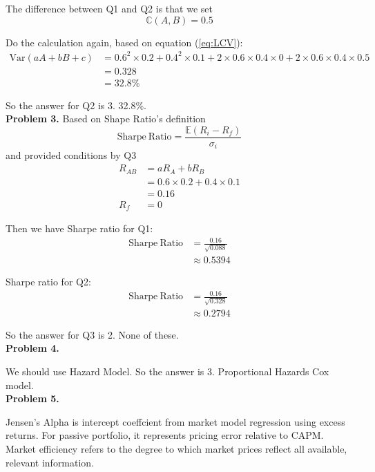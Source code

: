 \documentclass[12pt,a4paper]{article}
\begin{document}
The difference between Q1 and Q2 is that we set
\[
    \mathbb{C}(A,B) = 0.5
\]

Do the calculation again, based on equation (\ref{eq:LCV}):
\[
\begin{aligned}
    \mathrm{Var}(aA+bB+c) &= 0.6^2 \times 0.2 + 0.4^2 \times 0.1 + 2 \times 0.6 \times 0.4 \times 0 + 2 \times 0.6 \times 0.4 \times 0.5\\
    &= 0.328\\
    &= 32.8 \%
\end{aligned}
\]

So the answer for Q2 is 3. 32.8\%.
\\

\textbf{Problem 3.}
Based on Shape Ratio's definition
\[
    \mathrm{Sharpe\ Ratio} = \frac{\mathbb{E}(R_i - R_f)}{\sigma_i}
\]
and provided conditions by Q3
\[
    \begin{aligned}
        R_{AB} &= aR_A + bR_B\\
        &= 0.6\times 0.2 + 0.4 \times 0.1\\
        & = 0.16\\
        R_f &= 0
    \end{aligned}  
\]

Then we have Sharpe ratio for Q1:
\[
    \begin{aligned}
        \mathrm{Sharpe\ Ratio} &= \frac{0.16}{\sqrt{0.088}}\\
        & \approx 0.5394
    \end{aligned}  
\]

Sharpe ratio for Q2:
\[
    \begin{aligned}
        \mathrm{Sharpe\ Ratio} &= \frac{0.16}{\sqrt{0.328}}\\
        & \approx 0.2794
    \end{aligned}  
\]

So the answer for Q3 is 2. None of these.
\\

\textbf{Problem 4.}

We should use Hazard Model. So the answer is 3. Proportional Hazards Cox model.
\\

\textbf{Problem 5.}

Jensen's Alpha is intercept coeffcient from market model regression using excess returns. For passive portfolio, it represents pricing error relative to CAPM. Market efficiency refers to the degree to which market prices reflect all available, relevant information. 
\end{document}
